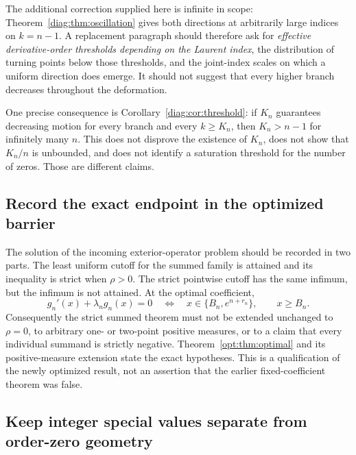\documentclass[11pt,a4paper]{article}
\theoremstyle{definition}
\theoremstyle{remark}
\numberwithin{equation}{section}
\begin{document}
The additional correction supplied here is infinite in scope:
Theorem~\ref{diag:thm:oscillation} gives both directions at arbitrarily
large indices on $k=n-1$. A replacement paragraph should therefore
ask for \emph{effective derivative-order thresholds depending on the
Laurent index}, the distribution of turning points below those
thresholds, and the joint-index scales on which a uniform direction
does emerge. It should not suggest that every higher branch decreases
throughout the deformation.

One precise consequence is Corollary~\ref{diag:cor:threshold}:
if $K_n$ guarantees decreasing motion for every branch and every
$k\ge K_n$, then $K_n>n-1$ for infinitely many $n$.
This does not disprove the existence of $K_n$, does not show that
$K_n/n$ is unbounded, and does not identify a saturation threshold
for the number of zeros. Those are different claims.

\subsection{Record the exact endpoint in the optimized barrier}

The solution of the incoming exterior-operator problem should be recorded
in two parts. The least uniform cutoff for the summed family is attained
and its inequality is strict when $\rho>0$. The strict pointwise cutoff
has the same infimum, but the infimum is not attained. At the optimal
coefficient,
\[
 g_n'(x)+\lambda_ng_n(x)=0
 \quad\Longleftrightarrow\quad
 x\in\{B_n,e^{n+r_n}\},\qquad x\ge B_n.
\]
Consequently the strict summed theorem must not be extended unchanged to
$\rho=0$, to arbitrary one- or two-point positive measures, or to a
claim that every individual summand is strictly negative.
Theorem~\ref{opt:thm:optimal} and its positive-measure extension state
the exact hypotheses. This is a qualification of the newly optimized
result, not an assertion that the earlier fixed-coefficient theorem
was false.

\subsection{Keep integer special values separate from order-zero geometry}
\end{document}
